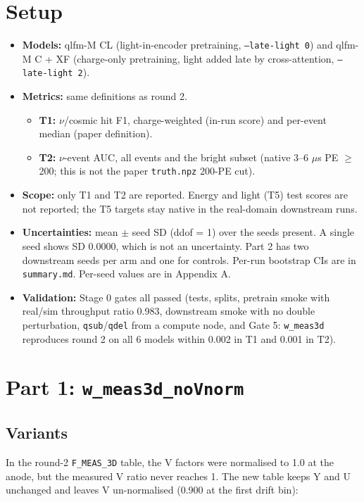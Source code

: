 \documentclass[10pt,a4paper]{article}
\begin{document}
\section{Setup}
\begin{itemize}
\item \textbf{Models:} qlfm-M CL (light-in-encoder pretraining, \texttt{--late-light 0}) and qlfm-M C + XF (charge-only pretraining, light added late by cross-attention, \texttt{--late-light 2}).
\item \textbf{Metrics:} same definitions as round 2.
\begin{itemize}
\item \textbf{T1:} $\nu$/cosmic hit F1, charge-weighted (in-run score) and per-event median (paper definition).
\item \textbf{T2:} $\nu$-event AUC, all events and the bright subset (native 3--6 $\mu$s PE $\geq$ 200; this is not the paper \texttt{truth.npz} 200-PE cut).
\end{itemize}
\item \textbf{Scope:} only T1 and T2 are reported. Energy and light (T5) test scores are not reported; the T5 targets stay native in the real-domain downstream runs.
\item \textbf{Uncertainties:} mean $\pm$ seed SD (ddof = 1) over the seeds present. A single seed shows SD 0.0000, which is not an uncertainty. Part 2 has two downstream seeds per arm and one for controls. Per-run bootstrap CIs are in \texttt{summary.md}. Per-seed values are in Appendix A.
\item \textbf{Validation:} Stage 0 gates all passed (tests, splits, pretrain smoke with real/sim throughput ratio 0.983, downstream smoke with no double perturbation, \texttt{qsub}/\texttt{qdel} from a compute node, and Gate 5: \texttt{w\_\allowbreak{}meas3d} reproduces round 2 on all 6 models within 0.002 in T1 and 0.001 in T2).
\end{itemize}
\section{Part 1: \texttt{w\_\allowbreak{}meas3d\_\allowbreak{}noVnorm}}
\subsection{Variants}
In the round-2 \texttt{F\_\allowbreak{}MEAS\_\allowbreak{}3D} table, the V factors were normalised to 1.0 at the anode, but the measured V ratio never reaches 1. The new table keeps Y and U unchanged and leaves V un-normalised (0.900 at the first drift bin):
\end{document}
